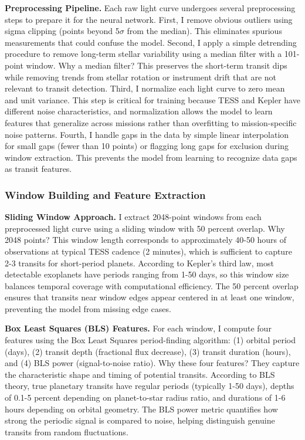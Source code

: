 \documentclass[letterpaper]{article} %
\begin{document}
\textbf{Preprocessing Pipeline.} Each raw light curve undergoes several preprocessing steps to prepare it for the neural network. First, I remove obvious outliers using sigma clipping (points beyond 5$\sigma$ from the median). This eliminates spurious measurements that could confuse the model. Second, I apply a simple detrending procedure to remove long-term stellar variability using a median filter with a 101-point window. Why a median filter? This preserves the short-term transit dips while removing trends from stellar rotation or instrument drift that are not relevant to transit detection. Third, I normalize each light curve to zero mean and unit variance. This step is critical for training because TESS and Kepler have different noise characteristics, and normalization allows the model to learn features that generalize across missions rather than overfitting to mission-specific noise patterns. Fourth, I handle gaps in the data by simple linear interpolation for small gaps (fewer than 10 points) or flagging long gaps for exclusion during window extraction. This prevents the model from learning to recognize data gaps as transit features.

\subsubsection{Window Building and Feature Extraction}

\textbf{Sliding Window Approach.} I extract 2048-point windows from each preprocessed light curve using a sliding window with 50 percent overlap. Why 2048 points? This window length corresponds to approximately 40-50 hours of observations at typical TESS cadence (2 minutes), which is sufficient to capture 2-3 transits for short-period planets. According to Kepler's third law, most detectable exoplanets have periods ranging from 1-50 days, so this window size balances temporal coverage with computational efficiency. The 50 percent overlap ensures that transits near window edges appear centered in at least one window, preventing the model from missing edge cases.

\textbf{Box Least Squares (BLS) Features.} For each window, I compute four features using the Box Least Squares period-finding algorithm: (1) orbital period (days), (2) transit depth (fractional flux decrease), (3) transit duration (hours), and (4) BLS power (signal-to-noise ratio). Why these four features? They capture the characteristic shape and timing of potential transits. According to BLS theory, true planetary transits have regular periods (typically 1-50 days), depths of 0.1-5 percent depending on planet-to-star radius ratio, and durations of 1-6 hours depending on orbital geometry. The BLS power metric quantifies how strong the periodic signal is compared to noise, helping distinguish genuine transits from random fluctuations.
\end{document}
